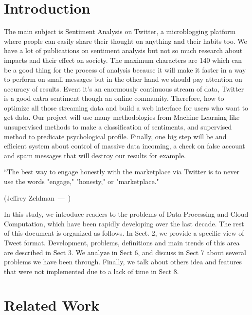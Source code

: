 \documentclass{acmtog} %
\let\oldquote\quote
\let\endoldquote\endquote
\renewenvironment{quote}[2][]
  {\if\relax\detokenize{#1}\relax
     \def\quoteauthor{#2}%
   \else
     \def\quoteauthor{#2~---~#1}%
   \fi
   \oldquote}
  {\par\nobreak\smallskip\hfill(\quoteauthor)%
   \endoldquote\addvspace{\bigskipamount}}
\begin{document}
\section{Introduction}
The main subject is \cite{Cuadros17} Sentiment Analysis on Twitter, \cite{Ayvazb17} a microblogging platform where people can easily share their thought on anything and their habits too. We have a lot of publications on sentiment analysis but not so much \cite{Marquez16} research about impacts and their effect on society. The maximum characters \cite{Jianqiang17} are 140 which can be a good thing for the process of analysis because it will make it faster in a way to perform on small messages but in the other hand we should pay attention on\cite{Meisheri17} accuracy of results. Event \cite{Jianqiang17} it’s an enormously continuous stream of data, Twitter is a good extra sentiment though an online community. Therefore, how to optimize all those streaming data \cite{Baltas17} and build a web interface for users who want to get data. Our project will \cite{Vyas17} use many methodologies from Machine Learning like unsupervised methods to make a classification of sentiments, and supervised method \cite{Palpanas11} to predicate psychological profile. Finally, one big step will be and efficient system about control of massive data incoming, a check on false account and spam messages that will destroy our \cite{Poddar16} results for example.
 
\begin{quote}{Jeffrey Zeldman}
“The best way to engage honestly with the marketplace via Twitter is to never use the words "engage," "honesty," or "marketplace." 
\end{quote}

In this study, we introduce readers to the problems of Data Processing and Cloud Computation, which have been rapidly developing over the last decade. The rest of this document is organized as follows. In Sect. 2, we provide a specific view of Tweet format. Development, problems, definitions and main trends of this area are described in Sect 3. We analyze in Sect 6, and discuss in Sect 7 about several problems we have been through.
Finally, we talk about others idea and features that were not implemented due to a lack of time in Sect 8.

\section{Related Work}
\label{sec:related_work}
\end{document}
